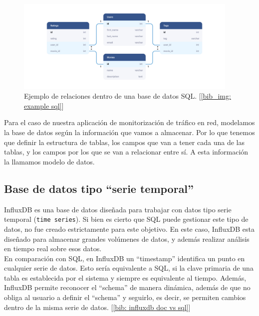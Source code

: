 \documentclass[a4paper, oneside, 12pt]{book}
\begin{document}
	\begin{figure}[h!]
		\begin{center}
			\includegraphics[width=0.95\textwidth]{img/example_relational_database.jpg}
			\caption{Ejemplo de relaciones dentro de una base de datos SQL. [\ref{bib_img: example sql}]}
			\label{img: example sql}
		\end{center}
	\end{figure}
	
	\noindent Para el caso de nuestra aplicación de monitorización de tráfico en red, modelamos la base de datos según la información que vamos a almacenar. Por lo que tenemos que definir la estructura de tablas, los campos que van a tener cada una de las tablas, y los campos por los que se van a relacionar entre sí. A esta información la llamamos modelo de datos.
	
	
	
	\pagebreak
	
	\subsection{Base de datos tipo ``serie temporal''} 
	
	\noindent InfluxDB es una base de datos diseñada para trabajar con datos tipo serie temporal (\texttt{time series}). Si bien es cierto que SQL puede gestionar este tipo de datos, no fue creado estrictamente para este objetivo. En este caso, InfluxDB esta diseñado para almacenar grandes volúmenes de datos, y además realizar análisis en tiempo real sobre esos datos. \\
	
	\noindent En comparación con SQL, en InfluxDB un ``timestamp'' identifica un punto en cualquier serie de datos. Esto sería equivalente a SQL, si la clave primaria de una tabla es establecida por el sistema y siempre es equivalente al tiempo. Además, InfluxDB permite reconocer el ``schema'' de manera dinámica, además de que no obliga al usuario a definir el ``schema'' y seguirlo, es decir, se permiten cambios dentro de la misma serie de datos. [\ref{bib: influxdb doc vs sql}] \\
	
\end{document}
